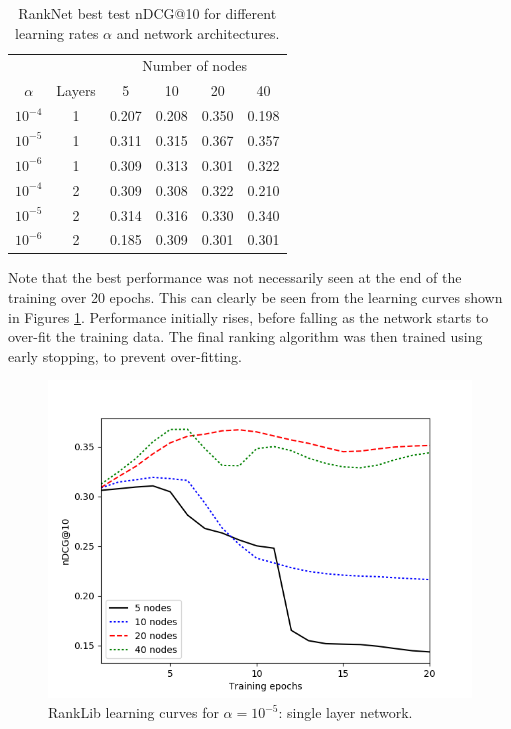 \documentclass[english]{article}
\theoremstyle{definition}
\begin{document}
\begin{multicols}{2}
\begin{table}[H]
\begin{center}
\begin{tabular}{c c c c c c}
  \hline
  {} & {} & \multicolumn{4}{c}{Number of nodes}\\
  $\alpha$ & Layers & 5 & 10 & 20 & 40\\
  \hline
  $10^{-4}$ & 1 & 0.207 & 0.208 & 0.350 & 0.198 \\
  $10^{-5}$ & 1 & 0.311 & 0.315 & 0.367 & 0.357\\
  $10^{-6}$ & 1 & 0.309 & 0.313 & 0.301 & 0.322 \\
  \hline
  $10^{-4}$ & 2 & 0.309 & 0.308 & 0.322 & 0.210 \\
  $10^{-5}$ & 2 & 0.314 & 0.316 & 0.330 & 0.340 \\
  $10^{-6}$ & 2 & 0.185 & 0.309 & 0.301 & 0.301 \\
  \hline
\end{tabular}
\caption{\label{tab:RankNet_train}RankNet best test nDCG@10 for different learning rates $\alpha$ and network architectures.}
\end{center}
\end{table}

Note that the best performance was not necessarily seen at the end of the training over 20 epochs.  This can clearly be seen from the learning curves shown in Figures \ref{fig:RankNet_1_lc}.  Performance initially rises, before falling as the network starts to over-fit the training data.  The final ranking algorithm was then trained using early stopping, to prevent over-fitting.  

\begin{figure}[H]
\includegraphics[width=\linewidth]{figures/RankNet_1_layer_training.png}
\caption{RankLib learning curves for $\alpha=10^{-5}$: single layer network.} \label{fig:RankNet_1_lc}
\end{figure}


\end{multicols}
\end{document}
